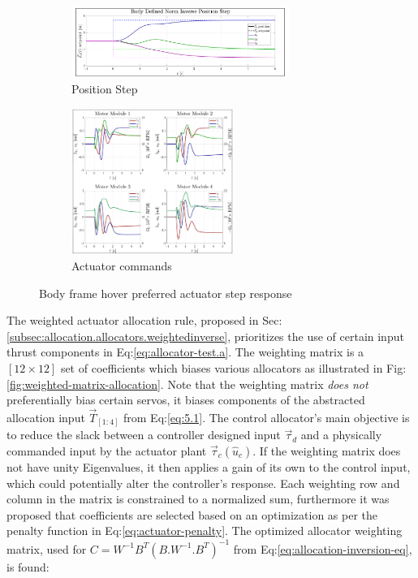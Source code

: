 \begin{figure}[htbp]
\ContinuedFloat
\begin{subfigure}{\textwidth}
\vspace{-3pt}
\centering
\includegraphics[width=0.78\textwidth]{graphs/body_norm_position}
\vspace{-4pt}
\caption{Position Step}
\label{fig:body_norm_position}
\end{subfigure}
\vspace{-8pt}
\begin{subfigure}{\textwidth}
\centering
\includegraphics[width=0.58\textwidth]{graphs/body_norm_input}
\vspace{-4pt}
\caption{Actuator commands}
\label{fig:body_norm_input}
\end{subfigure}
\caption{Body frame hover preferred actuator step response}
\label{fig:body-norm-step}
\vspace{-10pt}
\end{figure}
\par
The weighted actuator allocation rule, proposed in Sec:\ref{subsec:allocation.allocators.weightedinverse}, prioritizes the use of certain input thrust components in Eq:\ref{eq:allocator-test.a}. The weighting matrix is a $[12\times 12]$ set of coefficients which biases various allocators as illustrated in Fig:\ref{fig:weighted-matrix-allocation}. Note that the weighting matrix \emph{does not} preferentially bias certain servos, it biases components of the abstracted allocation input $\vec{T}_{[1:4]}$ from Eq:\ref{eq:5.1}. The control allocator's main objective is to reduce the slack between a controller designed input $\vec{\tau}_d$ and a physically commanded input by the actuator plant $\vec{\tau}_c(\hat{u}_c)$. If the weighting matrix does not have unity Eigenvalues, it then applies a gain of its own to the control input, which could potentially alter the controller's response. Each weighting row and column in the matrix is constrained to a normalized sum, furthermore it was proposed that coefficients are selected based on an optimization as per the penalty function in Eq:\ref{eq:actuator-penalty}. The optimized allocator weighting matrix, used for $C=W^{-1}B^T(B.W^{-1}.B^T)^{-1}$ from Eq:\ref{eq:allocation-inversion-eq}, is found:
